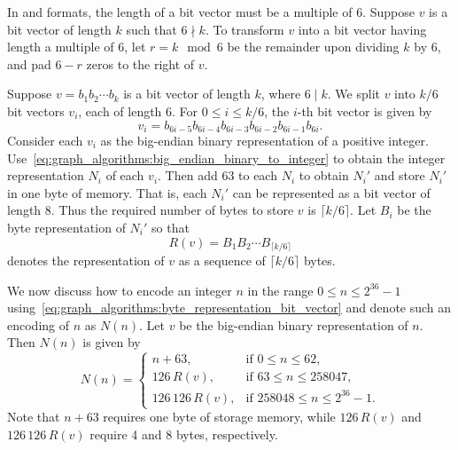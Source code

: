 In \graphsix\index{\graphsix} and \sparsesix\index{\sparsesix}
formats, the length of a bit vector must be a
multiple of 6. Suppose $v$ is a bit vector of length $k$ such that
$6 \nmid k$. To transform $v$ into a bit vector having length a
multiple of 6, let $r = k \mod 6$ be the remainder
upon dividing $k$ by 6, and pad $6 - r$ zeros to
the right of $v$.

Suppose $v = b_1 b_2 \cdots b_k$ is a bit vector of length $k$, where
$6 \mid k$. We split $v$ into $k/6$ bit vectors $v_i$, each of length
6. For $0 \leq i \leq k/6$, the $i$-th bit vector is given by
\[
v_i
=
b_{6i-5} b_{6i-4} b_{6i-3} b_{6i-2} b_{6i-1} b_{6i}.
\]
Consider each $v_i$ as the big-endian binary
representation of a positive
integer. Use~\eqref{eq:graph_algorithms:big_endian_binary_to_integer}
to obtain the integer representation $N_i$ of each $v_i$. Then add 63
to each $N_i$ to obtain $N_i'$ and store $N_i'$ in one byte of
memory. That is, each $N_i'$ can be represented as a bit vector of
length $8$. Thus the required number of bytes to store $v$ is
$\lceil k/6 \rceil$. Let $B_i$ be the byte representation of $N_i'$ so
that
\begin{equation}
\label{eq:graph_algorithms:byte_representation_bit_vector}
R(v)
=
B_1 B_2 \cdots B_{\lceil k/6 \rceil}
\end{equation}
denotes the representation of $v$ as a sequence of $\lceil k/6 \rceil$
bytes.

We now discuss how to encode an integer $n$ in the range
$0 \leq n \leq 2^{36} - 1$
using~\eqref{eq:graph_algorithms:byte_representation_bit_vector} and
denote such an encoding of $n$ as $N(n)$. Let $v$ be the
big-endian binary representation of $n$. Then $N(n)$
is given by
\begin{equation}
\label{eq:graph_algorithms:graph6_sparse6_graph_orders}
N(n)
=
\begin{cases}
n + 63, & \text{if $0 \leq n \leq 62$}, \\
126 \, R(v), & \text{if $63 \leq n \leq 258047$}, \\
126 \, 126 \, R(v), & \text{if $258048 \leq n \leq 2^{36}-1$}.
\end{cases}
\end{equation}
Note that $n + 63$ requires one byte of storage memory, while
$126 \, R(v)$ and $126 \, 126 \, R(v)$ require 4 and 8 bytes,
respectively.


